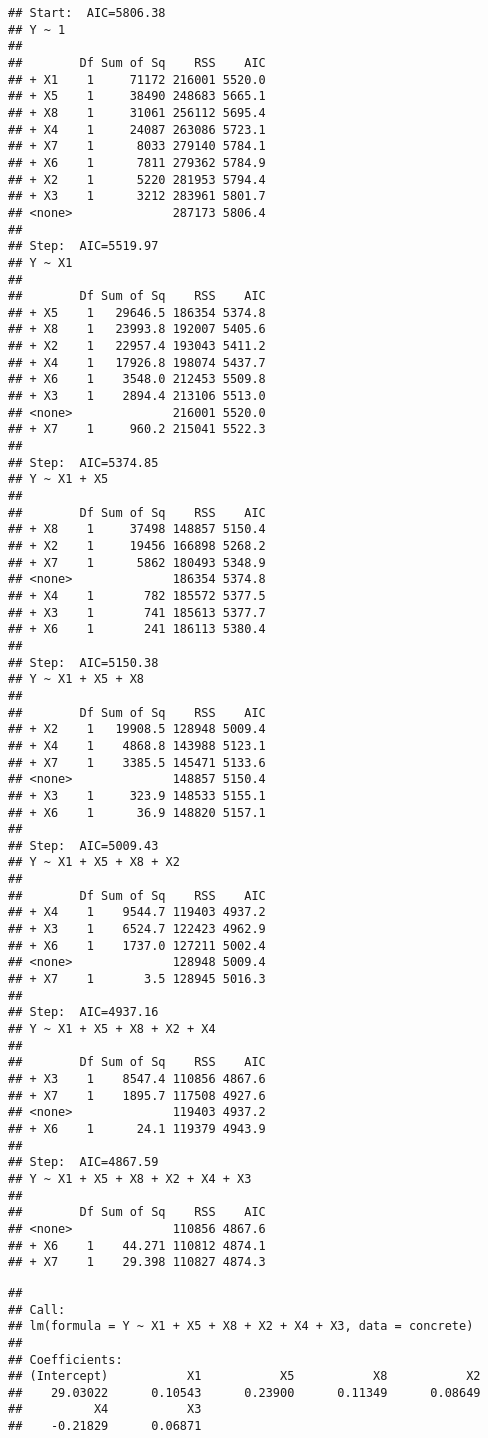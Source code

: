 \documentclass[]{article}
\begin{document}
\begin{verbatim}
## Start:  AIC=5806.38
## Y ~ 1
## 
##        Df Sum of Sq    RSS    AIC
## + X1    1     71172 216001 5520.0
## + X5    1     38490 248683 5665.1
## + X8    1     31061 256112 5695.4
## + X4    1     24087 263086 5723.1
## + X7    1      8033 279140 5784.1
## + X6    1      7811 279362 5784.9
## + X2    1      5220 281953 5794.4
## + X3    1      3212 283961 5801.7
## <none>              287173 5806.4
## 
## Step:  AIC=5519.97
## Y ~ X1
## 
##        Df Sum of Sq    RSS    AIC
## + X5    1   29646.5 186354 5374.8
## + X8    1   23993.8 192007 5405.6
## + X2    1   22957.4 193043 5411.2
## + X4    1   17926.8 198074 5437.7
## + X6    1    3548.0 212453 5509.8
## + X3    1    2894.4 213106 5513.0
## <none>              216001 5520.0
## + X7    1     960.2 215041 5522.3
## 
## Step:  AIC=5374.85
## Y ~ X1 + X5
## 
##        Df Sum of Sq    RSS    AIC
## + X8    1     37498 148857 5150.4
## + X2    1     19456 166898 5268.2
## + X7    1      5862 180493 5348.9
## <none>              186354 5374.8
## + X4    1       782 185572 5377.5
## + X3    1       741 185613 5377.7
## + X6    1       241 186113 5380.4
## 
## Step:  AIC=5150.38
## Y ~ X1 + X5 + X8
## 
##        Df Sum of Sq    RSS    AIC
## + X2    1   19908.5 128948 5009.4
## + X4    1    4868.8 143988 5123.1
## + X7    1    3385.5 145471 5133.6
## <none>              148857 5150.4
## + X3    1     323.9 148533 5155.1
## + X6    1      36.9 148820 5157.1
## 
## Step:  AIC=5009.43
## Y ~ X1 + X5 + X8 + X2
## 
##        Df Sum of Sq    RSS    AIC
## + X4    1    9544.7 119403 4937.2
## + X3    1    6524.7 122423 4962.9
## + X6    1    1737.0 127211 5002.4
## <none>              128948 5009.4
## + X7    1       3.5 128945 5016.3
## 
## Step:  AIC=4937.16
## Y ~ X1 + X5 + X8 + X2 + X4
## 
##        Df Sum of Sq    RSS    AIC
## + X3    1    8547.4 110856 4867.6
## + X7    1    1895.7 117508 4927.6
## <none>              119403 4937.2
## + X6    1      24.1 119379 4943.9
## 
## Step:  AIC=4867.59
## Y ~ X1 + X5 + X8 + X2 + X4 + X3
## 
##        Df Sum of Sq    RSS    AIC
## <none>              110856 4867.6
## + X6    1    44.271 110812 4874.1
## + X7    1    29.398 110827 4874.3
\end{verbatim}

\begin{verbatim}
## 
## Call:
## lm(formula = Y ~ X1 + X5 + X8 + X2 + X4 + X3, data = concrete)
## 
## Coefficients:
## (Intercept)           X1           X5           X8           X2  
##    29.03022      0.10543      0.23900      0.11349      0.08649  
##          X4           X3  
##    -0.21829      0.06871
\end{verbatim}
\end{document}
